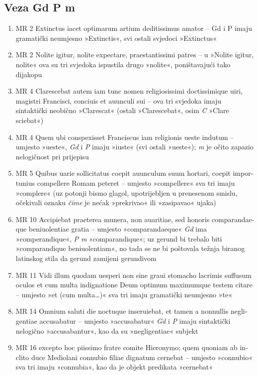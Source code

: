 \documentclass[a5paper,twoside]{article}
\begin{document}
\subsection{Veza Gd P m}

\begin{enumerate}[label=\alph*)]
\item MR 2 \textlatin{Extinctus iacet optimarum artium deditissimus amator} – Gd i P imaju gramatički neumjesno »Extinctis«, svi ostali svjedoci »Extinctus«
\item MR 2 \textlatin{Nolite igitur, nolite expectare, praestantissimi patres} – u »Nolite igitur, nolite« ova su tri svjedoka ispustila drugo »nolite«, poništavajući tako dijakopu
\item MR 4 \textlatin{Clarescebat autem iam tunc nomen religiosissimi doctissimique uiri, magistri Francisci, conciuis et auunculi sui} – ova tri svjedoka imaju sintaktički neobično »Clarescat« (ostali »Clarescebat«, osim \textit{C} »Clare sciebat«)
\item MR 4 \textlatin{Quem ubi conspexisset Franciscus iam religionis ueste indutum} – umjesto »ueste«, \textit{Gd} i \textit{P} imaju »iuste« (svi ostali »ueste«); \textit{m} je očito zapazio nelogičnost pri prijepisu
\item MR 5 \textlatin{Quibus uarie sollicitatus coepit auunculum suum hortari, coepit importunius compellere Romam peteret} – umjesto »compellere« sva tri imaju »complere« (uz potonji bismo glagol, upotrijebljen u prenesenom smislu, očekivali oznaku \textit{čime} je nećak »prekrivao« ili »zasipavao« ujaka)
\item MR 10 \textlatin{Accipiebat praeterea munera, non auaritiae, sed honoris comparandaeque beniuolentiae gratia} – umjesto »comparandaeque« \textit{Gd} ima »comperandique«, \textit{P m} »comparandique«; uz gerund bi trebalo biti »comparandique beniuolentiam«, no tada se ne bi poštovala težnja biranog latinskog stila da gerund zamijeni gerundivom
\item MR 11 \textlatin{Vidi illum quodam uesperi non sine graui stomacho lacrimis suffusum oculos et cum multa indignatione Deum optimum maximumque testem citare} – umjesto »et (cum multa\dots)« sva tri imaju gramatički neumjesno »te«
\item MR 14 \textlatin{Omnium saluti die noctuque inseruiebat, et tamen a nonnullis negligentiae accusabatur} – umjesto »accusabatur« \textit{Gd} i \textit{P} imaju sintaktički nelogično »accusabantur«, kao da su »negligentiae« subjekt
\item MR 16 \textlatin{excepto hoc piissimo fratre comite Hieronymo; quem quoniam ab inclito duce Mediolani connubio filiae dignatum cernebat} – umjesto »connubio« sva tri imaju »connubia«, kao da je objekt predikata »cernebat«

\end{enumerate}
\end{document}
